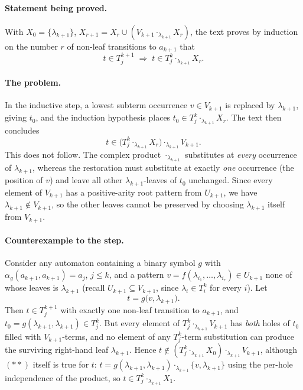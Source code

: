 \documentclass[11pt]{article}
\begin{document}
\paragraph{Statement being proved.} With
\(X_0=\{\lambda_{k+1}\}\), \(X_{r+1}=X_r\cup(V_{k+1}\cdot_{\lambda_{k+1}}X_r)\),
the text proves by induction on the number \(r\) of non-leaf transitions to
\(a_{k+1}\) that
\[
  t\in T_j^{k+1}
  \;\Longrightarrow\;
  t\in T_j^k\cdot_{\lambda_{k+1}}X_r .   \tag{\(**\)}
\]

\paragraph{The problem.} In the inductive step, a lowest subterm occurrence
\(v\in V_{k+1}\) is replaced by \(\lambda_{k+1}\), giving \(t_0\), and the
induction hypothesis places \(t_0\in T_j^k\cdot_{\lambda_{k+1}}X_r\).  The text
then concludes
\[
  t\in\bigl(T_j^k\cdot_{\lambda_{k+1}}X_r\bigr)
        \cdot_{\lambda_{k+1}}V_{k+1}.
\]
This does not follow.  The complex product \(\cdot_{\lambda_{k+1}}\)
substitutes at \emph{every} occurrence of \(\lambda_{k+1}\), whereas the
restoration must substitute at exactly \emph{one} occurrence (the position of
\(v\)) and leave all other \(\lambda_{k+1}\)-leaves of \(t_0\) unchanged.
Since every element of \(V_{k+1}\) has a positive-arity root pattern from
\(U_{k+1}\), we have \(\lambda_{k+1}\notin V_{k+1}\), so the other leaves
cannot be preserved by choosing \(\lambda_{k+1}\) itself from \(V_{k+1}\).

\paragraph{Counterexample to the step.} Consider any automaton containing a
binary symbol \(g\) with \(\alpha_g(a_{k+1},a_{k+1})=a_j\), \(j\le k\), and a
pattern \(v=f(\lambda_{i_1},\ldots,\lambda_{i_r})\in U_{k+1}\) none of whose
leaves is \(\lambda_{k+1}\) (recall \(U_{k+1}\subseteq V_{k+1}\), since
\(\lambda_i\in T_i^k\) for every \(i\)).  Let
\[
  t=g\bigl(v,\lambda_{k+1}\bigr).
\]
Then \(t\in T_j^{k+1}\) with exactly one non-leaf transition to \(a_{k+1}\),
and \(t_0=g(\lambda_{k+1},\lambda_{k+1})\in T_j^k\).  But every element of
\(T_j^k\cdot_{\lambda_{k+1}}V_{k+1}\) has \emph{both} holes of \(t_0\) filled
with \(V_{k+1}\)-terms, and no element of any \(T_j^k\)-term substitution can
produce the surviving right-hand leaf \(\lambda_{k+1}\).  Hence
\(t\notin(T_j^k\cdot_{\lambda_{k+1}}X_0)\cdot_{\lambda_{k+1}}V_{k+1}\),
although \((**)\) itself is true for \(t\):
\(t=g(\lambda_{k+1},\lambda_{k+1})\cdot_{\lambda_{k+1}}\{v,\lambda_{k+1}\}\)
using the per-hole independence of the product, so
\(t\in T_j^k\cdot_{\lambda_{k+1}}X_1\).
\end{document}
